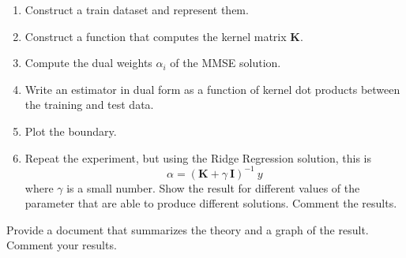 \documentclass[11pt]{article}
\begin{document}
\begin{enumerate}
    \item Construct a train dataset and represent them.
    \item Construct a function that computes the kernel matrix \(\mathbf{K}\).
    \item Compute the dual weights \(\alpha _i \) of the MMSE solution.
    \item Write an estimator in dual form as a function of kernel dot products between the training and test data.
    \item Plot the boundary.
    \item Repeat the experiment, but using the Ridge Regression solution, this is
    \begin{equation*}
        \alpha = (\mathbf{K} + \gamma\ \mathbf{I})^{-1}\ y
    \end{equation*}
    where \( \gamma \) is a small number. Show the result for different values of the parameter that are able to produce different solutions. Comment the results.
\end{enumerate}

Provide a document that summarizes the theory and a graph of the result. Comment your results.
\end{document}
